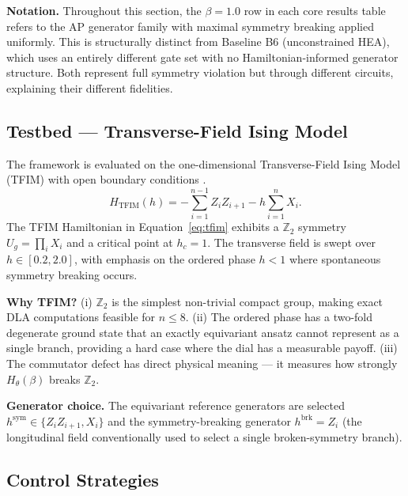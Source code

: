 \documentclass[10pt,twocolumn]{article}
\theoremstyle{remark}
\begin{document}
\textbf{Notation.} Throughout this section, the $\beta=1.0$ row in each core results table refers to the AP generator family with maximal symmetry breaking applied uniformly. This is structurally distinct from Baseline B6 (unconstrained HEA), which uses an entirely different gate set with no Hamiltonian-informed generator structure. Both represent full symmetry violation but through different circuits, explaining their different fidelities.

\subsection{Testbed --- Transverse-Field Ising Model}

The framework is evaluated on the one-dimensional Transverse-Field Ising Model (TFIM) with open boundary conditions \cite{pfeuty1970one,sachdev2011quantum}.
\begin{equation}
H_{\text{TFIM}}(h) = -\sum_{i=1}^{n-1} Z_i Z_{i+1} - h \sum_{i=1}^n X_i.
\label{eq:tfim}
\end{equation}
The TFIM Hamiltonian in Equation~\eqref{eq:tfim} exhibits a $\mathbb{Z}_2$ symmetry $U_g = \prod_i X_i$ and a critical point at $h_c = 1$. The transverse field is swept over $h \in [0.2, 2.0]$, with emphasis on the ordered phase $h < 1$ where spontaneous symmetry breaking occurs.

\textbf{Why TFIM?} (i) $\mathbb{Z}_2$ is the simplest non-trivial compact group, making exact DLA computations feasible for $n \le 8$. (ii) The ordered phase has a two-fold degenerate ground state that an exactly equivariant ansatz cannot represent as a single branch, providing a hard case where the dial has a measurable payoff. (iii) The commutator defect has direct physical meaning --- it measures how strongly $H_\theta(\beta)$ breaks $\mathbb{Z}_2$.

\textbf{Generator choice.} The equivariant reference generators are selected $h^{\text{sym}} \in \{Z_i Z_{i+1}, X_i\}$ and the symmetry-breaking generator $h^{\text{brk}} = Z_i$ (the longitudinal field conventionally used to select a single broken-symmetry branch).

\subsection{Control Strategies}
\end{document}
